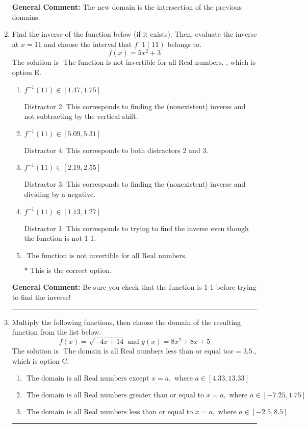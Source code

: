 \documentclass{extbook}[14pt]
\newcommand{\litem}[1]{\item #1

\rule{\textwidth}{0.4pt}}
\begin{document}
\begin{enumerate}
{\begin{enumerate}[label=\Alph*.]
\end{enumerate}

\textbf{General Comment:} The new domain is the intersection of the previous domains.
}
\litem{
Find the inverse of the function below (if it exists). Then, evaluate the inverse at $x = 11$ and choose the interval that $f^-1(11)$ belongs to.
\[ f(x) = 5 x^2 + 3 \]The solution is \( \text{ The function is not invertible for all Real numbers. } \), which is option E.\begin{enumerate}[label=\Alph*.]
\item \( f^{-1}(11) \in [1.47, 1.75] \)

 Distractor 2: This corresponds to finding the (nonexistent) inverse and not subtracting by the vertical shift.
\item \( f^{-1}(11) \in [5.09, 5.31] \)

 Distractor 4: This corresponds to both distractors 2 and 3.
\item \( f^{-1}(11) \in [2.19, 2.55] \)

 Distractor 3: This corresponds to finding the (nonexistent) inverse and dividing by a negative.
\item \( f^{-1}(11) \in [1.13, 1.27] \)

 Distractor 1: This corresponds to trying to find the inverse even though the function is not 1-1. 
\item \( \text{ The function is not invertible for all Real numbers. } \)

* This is the correct option.
\end{enumerate}

\textbf{General Comment:} Be sure you check that the function is 1-1 before trying to find the inverse!
}
\litem{
Multiply the following functions, then choose the domain of the resulting function from the list below.
\[ f(x) = \sqrt{-4x+14}  \text{ and } g(x) = 8x^{2} +8 x + 5 \]The solution is \( \text{ The domain is all Real numbers less than or equal to} x = 3.5. \), which is option C.\begin{enumerate}[label=\Alph*.]
\item \( \text{ The domain is all Real numbers except } x = a, \text{ where } a \in [4.33, 13.33] \)


\item \( \text{ The domain is all Real numbers greater than or equal to } x = a, \text{ where } a \in [-7.25, 1.75] \)


\item \( \text{ The domain is all Real numbers less than or equal to } x = a, \text{ where } a \in [-2.5, 8.5] \)



\end{enumerate}}
\end{enumerate}
\end{document}
